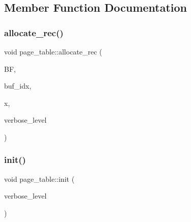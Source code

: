 \subsection{Member Function Documentation}
\mbox{\label{classpage__table_a45e2028ce5759778964466cd67d19a21}} 
\subsubsection{\texorpdfstring{allocate\+\_\+rec()}{allocate\_rec()}}
{\footnotesize\ttfamily void page\+\_\+table\+::allocate\+\_\+rec (\begin{DoxyParamCaption}\item[{\mbox{\hyperlink{discreta_8h_a4966414b761cd8d10ba385fe5e7c07fc}{Buffer}} $\ast$}]{BF,  }\item[{\mbox{\hyperlink{galois_8h_a09fddde158a3a20bd2dcadb609de11dc}{I\+NT}}}]{buf\+\_\+idx,  }\item[{\mbox{\hyperlink{galois_8h_a09fddde158a3a20bd2dcadb609de11dc}{I\+NT}}}]{x,  }\item[{\mbox{\hyperlink{galois_8h_a09fddde158a3a20bd2dcadb609de11dc}{I\+NT}}}]{verbose\+\_\+level }\end{DoxyParamCaption})}

\mbox{\label{classpage__table_a046f41976c1bb69534449e719ef7168a}} 
\subsubsection{\texorpdfstring{init()}{init()}}
{\footnotesize\ttfamily void page\+\_\+table\+::init (\begin{DoxyParamCaption}\item[{\mbox{\hyperlink{galois_8h_a09fddde158a3a20bd2dcadb609de11dc}{I\+NT}}}]{verbose\+\_\+level }\end{DoxyParamCaption})}

\mbox{\label{classpage__table_ac18edf8272923c6bbcff0f38a8527f26}} 
